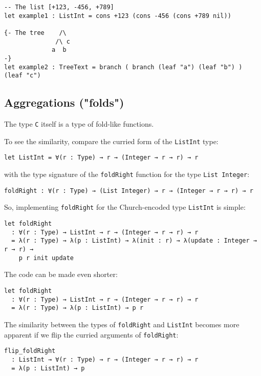 \begin{lstlisting}[language=Dhall]
-- The list [+123, -456, +789]
let example1 : ListInt = cons +123 (cons -456 (cons +789 nil))

{- The tree    /\
              /\ c
             a  b
-}
let example2 : TreeText = branch ( branch (leaf "a") (leaf "b") ) (leaf "c")
\end{lstlisting}


\subsection{Aggregations ("folds")}


The type \lstinline!C! itself is a type of fold-like functions.


To see the similarity, compare the curried form of the \lstinline!ListInt! type:


\begin{lstlisting}[language=Dhall]
let ListInt = ∀(r : Type) → r → (Integer → r → r) → r
\end{lstlisting}


with the type signature of the \lstinline!foldRight! function for the type \lstinline!List Integer!:


\begin{lstlisting}[language=Dhall]
foldRight : ∀(r : Type) → (List Integer) → r → (Integer → r → r) → r
\end{lstlisting}


So, implementing \lstinline!foldRight! for the Church-encoded type \lstinline!ListInt! is simple:


\begin{lstlisting}[language=Dhall]
let foldRight
  : ∀(r : Type) → ListInt → r → (Integer → r → r) → r
  = λ(r : Type) → λ(p : ListInt) → λ(init : r) → λ(update : Integer → r → r) →
    p r init update
\end{lstlisting}


The code can be made even shorter:


\begin{lstlisting}[language=Dhall]
let foldRight
  : ∀(r : Type) → ListInt → r → (Integer → r → r) → r
  = λ(r : Type) → λ(p : ListInt) → p r
\end{lstlisting}


The similarity between the types of \lstinline!foldRight! and \lstinline!ListInt! becomes more apparent if we flip the curried arguments of \lstinline!foldRight!:


\begin{lstlisting}[language=Dhall]
flip_foldRight
  : ListInt → ∀(r : Type) → r → (Integer → r → r) → r
  = λ(p : ListInt) → p
\end{lstlisting}


